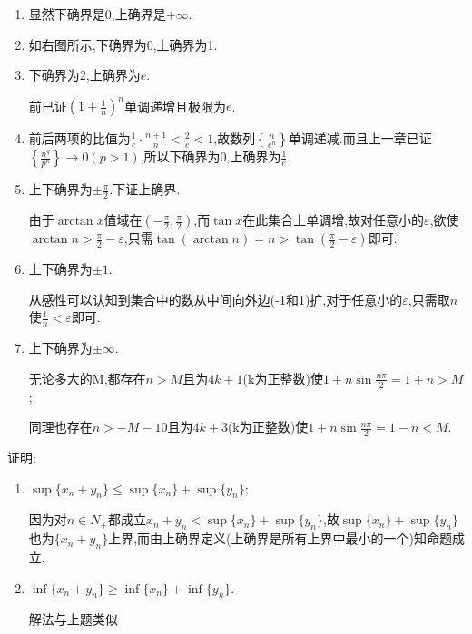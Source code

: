      \begin{solution}
         \begin{enumerate}
             \item  显然下确界是0,上确界是$+\infty$.
             \item 如右图所示,下确界为0,上确界为1.
             \item 下确界为2,上确界为$e$.

                   前已证$\left(1+\frac{1}{n}\right)^n$单调递增且极限为$e$.
             \item 前后两项的比值为$\frac{1}{e}\cdot\frac{n+1}{n}<\frac{2}{e}<1$,故数列$\left\{\frac{n}{e^n}\right\}$单调递减.而且上一章已证$\left\{\frac{n^q}{p^n}\right\}\to 0(p>1)$,所以下确界为0,上确界为$\frac{1}{e}$.
             \item 上下确界为$\pm \frac{\pi}{2}$.下证上确界.

                   由于$\arctan x$值域在$\left(-\frac{\pi}{2},\frac{\pi}{2}\right)$,而$\tan x$在此集合上单调增,故对任意小的$\varepsilon$,欲使$\arctan n>\frac{\pi}{2}-\varepsilon$,只需$\tan(\arctan n)=n>\tan\left(\frac{\pi}{2}-\varepsilon\right)$即可.
             \item 上下确界为$\pm 1$.

                   从感性可以认知到集合中的数从中间向外边(-1和1)扩,对于任意小的$\varepsilon$,只需取$n$使$\frac{1}{n}<\varepsilon$即可.
             \item 上下确界为$\pm \infty$.

                   无论多大的M,都存在$n>M$且为$4k+1$(k为正整数)使$1+n\sin\frac{n\pi}{2}=1+n>M$;

                   同理也存在$n>-M-10$且为$4k+3$(k为正整数)使$1+n\sin\frac{n\pi}{2}=1-n<M$.
         \end{enumerate}

     \end{solution}

     \begin{exercise}
         证明:
         \begin{enumerate}
             \item $\sup\{x_n+y_n\}\leqslant \sup\{x_n\}+\sup\{y_n\}$;
                   \begin{solution}
                       因为对$n\in N_+$都成立$x_n+y_n<\sup\{x_n\}+\sup\{y_n\}$,故$\sup\{x_n\}+\sup\{y_n\}$也为$\{x_n+y_n\}$上界,而由上确界定义(上确界是所有上界中最小的一个)知命题成立.
                   \end{solution}
             \item $\inf\{x_n+y_n\}\geqslant\inf\{x_n\}+\inf\{y_n\}$.
                   \begin{solution}
                       解法与上题类似
                   \end{solution}
         \end{enumerate}
     \end{exercise}

